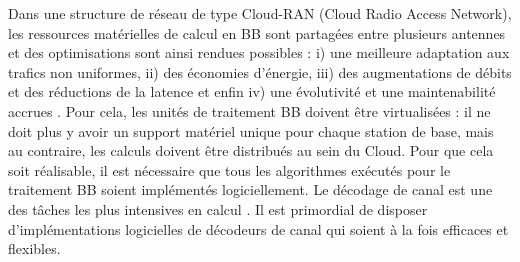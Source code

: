 Dans une structure de réseau de type Cloud-RAN (Cloud Radio Access Network), les ressources matérielles de calcul en BB sont partagées entre plusieurs antennes et des optimisations sont ainsi rendues possibles : i) une meilleure adaptation aux trafics non uniformes, ii) des économies d'énergie, iii) des augmentations de débits et des réductions de la latence et enfin iv) une évolutivité et une maintenabilité accrues \cite{checko_cloud_2015}. Pour cela, les unités de traitement BB doivent être virtualisées : il ne doit plus y avoir un support matériel unique pour chaque station de base, mais au contraire, les calculs doivent être distribués au sein du Cloud. Pour que cela soit réalisable, il est nécessaire que tous les algorithmes exécutés pour le traitement BB soient implémentés logiciellement. Le décodage de canal est une des tâches les plus intensives en calcul \cite{rodriguez_towards_2017,nikaein_processing_2015}. Il est primordial de disposer d'implémentations logicielles de décodeurs de canal qui soient à la fois efficaces et flexibles.

